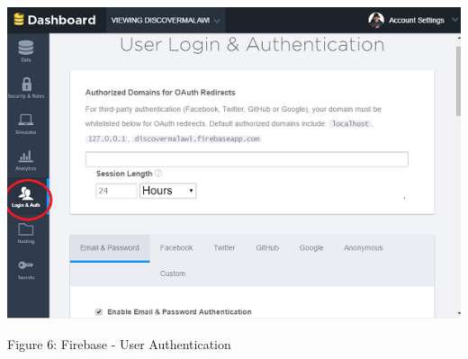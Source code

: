 \begin{center}    
	\includegraphics{img/userauth.png}
\end{center}
\begin{center}
	Figure 6: Firebase - User Authentication
\end{center}

\paragraph{}
